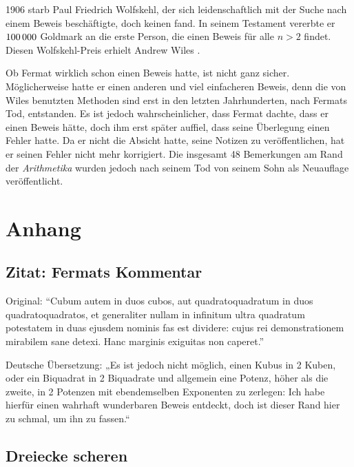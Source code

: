 \documentclass[a4paper,12pt]{article}
\begin{document}
1906 starb Paul Friedrich Wolfskehl, der sich leidenschaftlich mit der Suche nach einem Beweis beschäftigte, doch keinen fand. In seinem Testament vererbte er $100\mkern 3mu000$ Goldmark an die erste Person, die einen Beweis für alle $n>2$ findet. Diesen Wolfskehl-Preis erhielt Andrew Wiles  \cite{WolfskehlPreis}.

Ob Fermat wirklich schon einen Beweis hatte, ist nicht ganz sicher. Möglicherweise hatte er einen anderen und viel einfacheren Beweis, denn die von Wiles benutzten Methoden sind erst in den letzten Jahrhunderten, nach Fermats Tod,  entstanden. Es ist jedoch wahrscheinlicher, dass Fermat dachte, dass er einen Beweis hätte, doch ihm erst später auffiel, dass seine Überlegung einen Fehler hatte. Da er nicht die Absicht hatte, seine Notizen zu veröffentlichen, hat er seinen Fehler nicht mehr korrigiert. Die insgesamt 48 Bemerkungen am Rand der \textit{Arithmetika} wurden jedoch nach seinem Tod von seinem Sohn als Neuauflage veröffentlicht.

\newpage

\section{Anhang}

\subsection{Zitat: Fermats Kommentar}

Original: “Cubum autem in duos cubos, aut quadratoquadratum in duos quadratoquadratos, et generaliter nullam in infinitum ultra quadratum potestatem in duas ejusdem nominis fas est dividere: cujus rei demonstrationem mirabilem sane detexi. Hanc marginis exiguitas non caperet.”

Deutsche Übersetzung: „Es ist jedoch nicht möglich, einen Kubus in 2 Kuben, oder ein Biquadrat in 2 Biquadrate und allgemein eine Potenz, höher als die zweite, in 2 Potenzen mit ebendemselben Exponenten zu zerlegen: Ich habe hierfür einen wahrhaft wunderbaren Beweis entdeckt, doch ist dieser Rand hier zu schmal, um ihn zu fassen.“ \cite{GroßerFermatscheSatzWiki}

\subsection{Dreiecke scheren}
\end{document}
